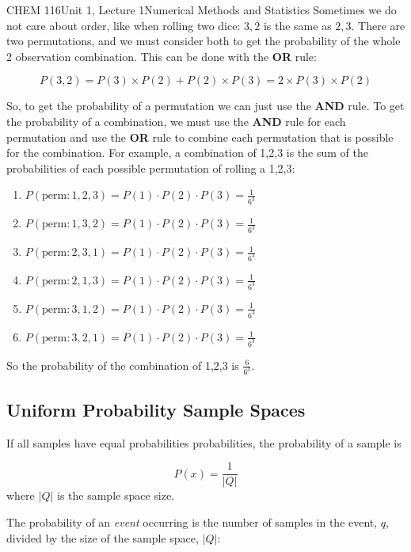 \documentclass{article}
\begin{document}
\begin{tdoc}{CHEM 116}{Unit 1, Lecture 1}{Numerical Methods and Statistics}
Sometimes we do not care about order, like when rolling two dice:
$3,2$ is the same as $2,3$. There are two permutations, and we must
consider both to get the probability of the whole 2 observation
combination. This can be done with the {\bf OR} rule:

\begin{equation}
P(3,2) = P(3)\times P(2) + P(2) \times P(3) = 2\times P(3)\times P(2)
\end{equation}

So, to get the probability of a permutation we can just use the {\bf
  AND} rule. To get the probability of a combination, we must use the
{\bf AND} rule for each permutation and use the {\bf OR} rule to
combine each permutation that is possible for the combination. For
example, a combination of 1,2,3 is the sum of the probabilities of
each possible permutation of rolling a 1,2,3:
\begin{enumerate}
\item $P(\textrm{perm}: 1,2,3) = P(1)\cdot P(2) \cdot P(3) = \frac{1}{6^3}$
\item $P(\textrm{perm}: 1,3,2) = P(1)\cdot P(2) \cdot P(3) = \frac{1}{6^3}$  
\item $P(\textrm{perm}: 2,3,1) = P(1)\cdot P(2) \cdot P(3) = \frac{1}{6^3}$
\item $P(\textrm{perm}: 2,1,3) = P(1)\cdot P(2) \cdot P(3) = \frac{1}{6^3}$
\item $P(\textrm{perm}: 3,1,2) = P(1)\cdot P(2) \cdot P(3) = \frac{1}{6^3}$
\item $P(\textrm{perm}: 3,2,1) = P(1)\cdot P(2) \cdot P(3) = \frac{1}{6^3}$
\end{enumerate}
So the probability of the combination of 1,2,3 is
$\frac{6}{6^3}$.

\subsection{Uniform Probability Sample Spaces} 

If all samples have equal probabilities probabilities, the probability of a
sample is

\begin{equation}
P(x) = \frac{1}{|Q|}
\end{equation}
where $|Q|$ is the sample space size.
\vspace{0.2cm}


The probability of an \emph{event} occurring is the number of samples
in the event, $q$, divided by the size of the sample space, $|Q|$:


\end{tdoc}
\end{document}
